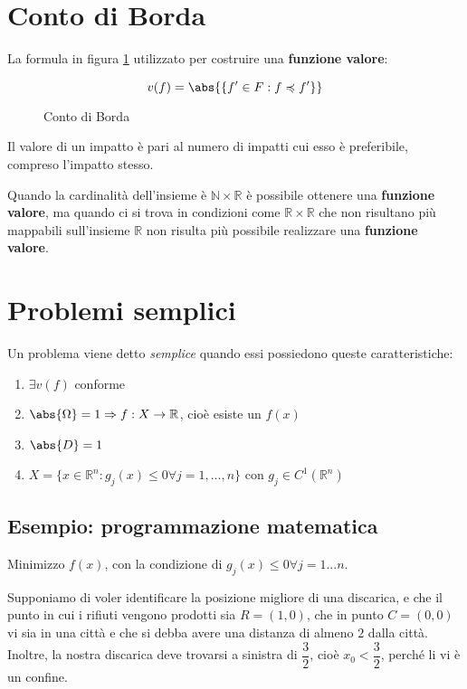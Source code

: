 \documentclass[\main/main.tex]{subfiles}
\begin{document}
\section{Conto di Borda}
La formula in figura \ref{borda} utilizzato per costruire una \textbf{funzione valore}:

\begin{figure}[H]
\[ 
	v(f) = \abs{\{f' \in F: f \preccurlyeq f' \}}
\]
\caption{Conto di Borda}
\label{borda}
\end{figure}

Il valore di un impatto è pari al numero di impatti cui esso è preferibile, compreso l'impatto stesso.

Quando la cardinalità dell'insieme è $\mathbb{N}\times\mathbb{R}$ è possibile ottenere una \textbf{funzione valore}, ma quando ci si trova in condizioni come $\mathbb{R}\times\mathbb{R}$ che non risultano più mappabili sull'insieme $\mathbb{R}$ non risulta più possibile realizzare una \textbf{funzione valore}.

\section{Problemi semplici}
Un problema viene detto \textit{semplice} quando essi possiedono queste caratteristiche:

\begin{enumerate}
\item $\exists v(f) $ conforme
\item $\abs{\Omega} = 1 \Rightarrow f: X \rightarrow \mathbb{R}$, cioè esiste un $f(x)$
\item $\abs{D} = 1$
\item $X = \{x \in \mathbb{R}^n: g_j (x) \leq 0 \forall j = 1,..., n \} \text{ con } g_j \in C^1(\mathbb{R}^n)$
\end{enumerate}

\subsection{Esempio: programmazione matematica}
Minimizzo $f(x)$, con la condizione di $g_j(x) \leq 0 \forall j = 1...n $.

Supponiamo di voler identificare la posizione migliore di una discarica, e che il punto in cui i rifiuti vengono prodotti sia $R = (1,0)$, che in punto $C = (0,0)$ vi sia in una città e che si debba avere una distanza di almeno $2$ dalla città. Inoltre, la nostra discarica deve trovarsi a sinistra di $\dfrac{3}{2}$, cioè $x_0 < \dfrac{3}{2}$, perché li vi è un confine.
\end{document}
